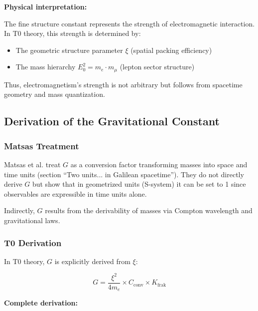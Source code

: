 	\textbf{Physical interpretation:}
	
	The fine structure constant represents the strength of electromagnetic interaction. In T0 theory, this strength is determined by:
	\begin{itemize}
		\item The geometric structure parameter $\xi$ (spatial packing efficiency)
		\item The mass hierarchy $E_0^2 = m_e \cdot m_\mu$ (lepton sector structure)
	\end{itemize}
	
	Thus, electromagnetism's strength is not arbitrary but follows from spacetime geometry and mass quantization.
	
	\subsection{Derivation of the Gravitational Constant}\label{sec:G_derivation}
	
	\subsubsection{Matsas Treatment}
	
	Matsas et al. treat $G$ as a conversion factor transforming masses into space and time units (section ``Two units... in Galilean spacetime''). They do not directly derive $G$ but show that in geometrized units (S-system) it can be set to 1 since observables are expressible in time units alone.
	
	Indirectly, $G$ results from the derivability of masses via Compton wavelength and gravitational laws.
	
	\subsubsection{T0 Derivation}
	
	In T0 theory, $G$ is explicitly derived from $\xi$:
	
	\begin{keyresult}
		\[
		G = \frac{\xi^2}{4 m_e} \times C_{\text{conv}} \times K_{\text{frak}}
		\]
	\end{keyresult}
	
	\textbf{Complete derivation:}
	
